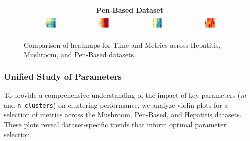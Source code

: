 \begin{figure}[H]
{\begin{tabular}{cccc}
			\multicolumn{4}{c}{\textbf{Pen-Based Dataset}} \\ 
			\includegraphics[width=0.23\textwidth]{figures/FuzzyCMeans/PenBased/Time_Heatmap_n_clusters_vs_fuzziness.png} &
			\includegraphics[width=0.23\textwidth]{figures/FuzzyCMeans/PenBased/Metric_Heatmap_fuzziness_vs_n_clusters.png} &
			\includegraphics[width=0.23\textwidth]{figures/FuzzyCMeans/PenBased/Time_Heatmap_n_clusters_vs_rho.png} &
			\includegraphics[width=0.23\textwidth]{figures/FuzzyCMeans/PenBased/Metric_Heatmap_rho_vs_fuzziness.png} \\
		\end{tabular}
	}
	\caption{Comparison of heatmaps for Time and Metrics across Hepatitis, Mushroom, and Pen-Based datasets.}
	\label{fig:heatmaps_grid_comparison_fuzzy}
\end{figure}

\subsubsection{Unified Study of Parameters}

To provide a comprehensive understanding of the impact of key parameters (\textit{m} and \texttt{n\_clusters}) on clustering performance, we analyze violin plots for a selection of metrics across the Mushroom, Pen-Based, and Hepatitis datasets. These plots reveal dataset-specific trends that inform optimal parameter selection.

